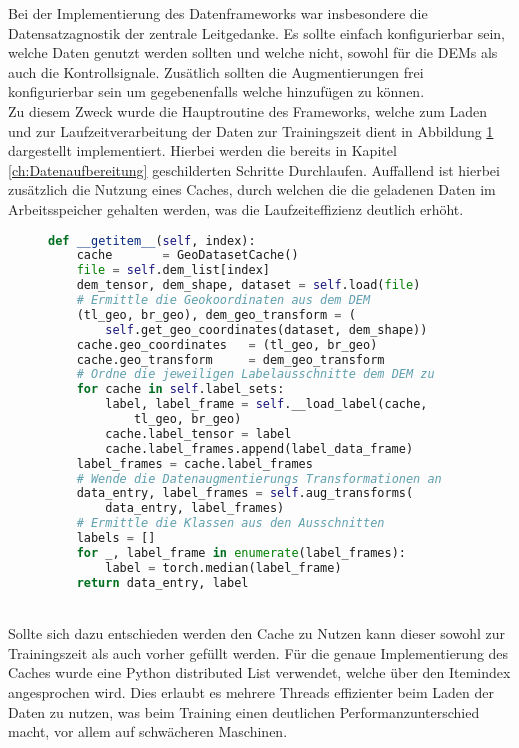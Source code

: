 Bei der Implementierung des Datenframeworks war insbesondere die Datensatzagnostik der zentrale Leitgedanke. Es sollte einfach konfigurierbar sein, welche Daten genutzt werden sollten und welche nicht, sowohl für die \ac{DEM}s als auch die Kontrollsignale. Zusätlich sollten die Augmentierungen frei konfigurierbar sein um gegebenenfalls welche hinzufügen zu können. \\
Zu diesem Zweck wurde die Hauptroutine des Frameworks, welche zum Laden und zur Laufzeitverarbeitung der Daten zur Trainingszeit dient in Abbildung \ref{fig:Data_runtime} dargestellt implementiert. Hierbei werden die bereits in Kapitel \ref{ch:Datenaufbereitung} geschilderten Schritte Durchlaufen. Auffallend ist hierbei zusätzlich die Nutzung eines Caches, durch welchen die die geladenen Daten im Arbeitsspeicher gehalten werden, was die Laufzeiteffizienz deutlich erhöht.
\begin{figure}[htbp]
\begin{lstlisting}[language=python]
def __getitem__(self, index):
    cache       = GeoDatasetCache()
    file = self.dem_list[index]
    dem_tensor, dem_shape, dataset = self.load(file)  
    # Ermittle die Geokoordinaten aus dem DEM
    (tl_geo, br_geo), dem_geo_transform = (
        self.get_geo_coordinates(dataset, dem_shape))    
    cache.geo_coordinates   = (tl_geo, br_geo)
    cache.geo_transform     = dem_geo_transform
    # Ordne die jeweiligen Labelausschnitte dem DEM zu 
    for cache in self.label_sets:
        label, label_frame = self.__load_label(cache, 
            tl_geo, br_geo)
        cache.label_tensor = label
        cache.label_frames.append(label_data_frame)
    label_frames = cache.label_frames
    # Wende die Datenaugmentierungs Transformationen an 
    data_entry, label_frames = self.aug_transforms(
        data_entry, label_frames)
    # Ermittle die Klassen aus den Ausschnitten 
    labels = []
    for _, label_frame in enumerate(label_frames):
        label = torch.median(label_frame)
    return data_entry, label
\end{lstlisting}
    \captionsetup{type=figure}
    \label{fig:Data_runtime}
\end{figure} \\
Sollte sich dazu entschieden werden den Cache zu Nutzen kann dieser sowohl zur Trainingszeit als auch vorher gefüllt werden. Für die genaue Implementierung des Caches wurde eine Python distributed List verwendet, welche über den Itemindex angesprochen wird. Dies erlaubt es mehrere Threads effizienter beim Laden der Daten zu nutzen, was beim Training einen deutlichen Performanzunterschied macht, vor allem auf schwächeren Maschinen. 

